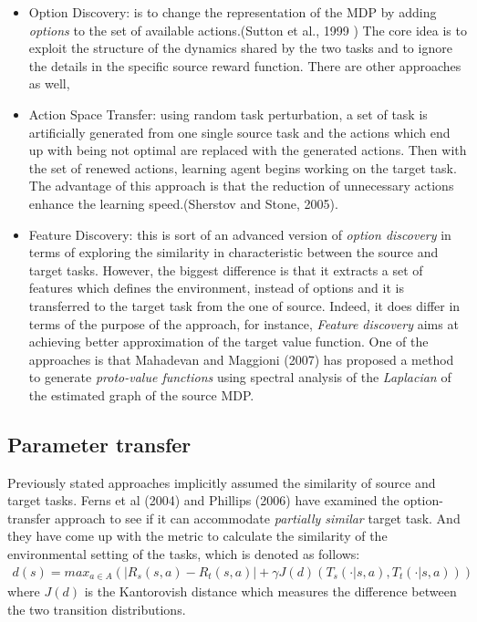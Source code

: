 \documentclass{article}
\begin{document}
\begin{itemize}
    \item Option Discovery: is to change the representation of the MDP by adding \textit{options} to the set of available actions.(Sutton et al., 1999 \cite{sutton1999between}) The core idea is to exploit the structure of the dynamics shared by the two tasks and to ignore the details in the specific source reward function. There are other approaches as well, \cite{mcgovern2001automatic} \cite{menache2002q}
    \item Action Space Transfer: using random task perturbation, a set of task is artificially generated from one single source task and the actions which end up with being not optimal are replaced with the generated actions. Then with the set of renewed actions, learning agent begins working on the target task. The advantage of this approach is that the reduction of unnecessary actions enhance the learning speed.(Sherstov and Stone, 2005\cite{sherstov2005improving}).
    \item Feature Discovery: this is sort of an advanced version of \textit{option discovery} in terms of exploring the similarity in characteristic between the source and target tasks. However, the biggest difference is that it extracts a set of features which defines the environment, instead of options and it is transferred to the target task from the one of source. Indeed, it does differ in terms of the purpose of the approach, for instance, \textit{Feature discovery} aims at achieving better approximation of the target value function. One of the approaches is that Mahadevan and Maggioni (2007)\cite{mahadevan2007proto} has proposed a method to generate \textit{proto-value functions} using spectral analysis of the \textit{Laplacian} of the estimated graph of the source MDP.
\end{itemize}

\subsection{Parameter transfer}
Previously stated approaches implicitly assumed the similarity of source and target tasks. Ferns et al (2004) and Phillips (2006) have examined the option-transfer approach to see if it can accommodate \textit{partially similar} target task. And they have come up with the metric to calculate the similarity of the environmental setting of the tasks, which is denoted as follows:
\begin{gather}
    d(s) = max_{a \in A}(|R_s(s,a) - R_t(s,a)| + \gamma J(d)(T_s(\cdot|s,a), T_t(\cdot|s,a)))
\end{gather} where $J(d)$ is the Kantorovish distance which measures the difference between the two transition distributions.
\end{document}
